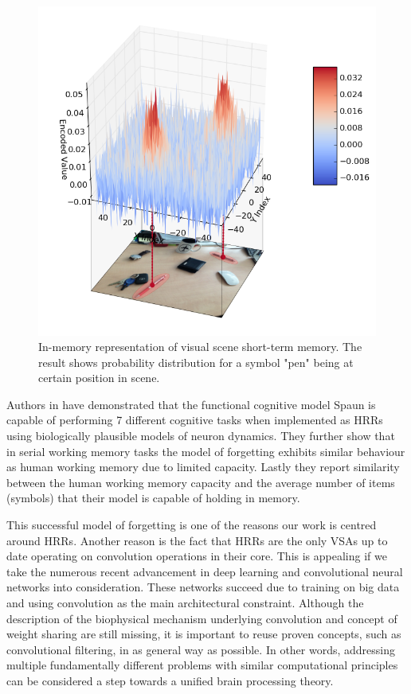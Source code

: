 \documentclass[conference]{IEEEtran}
\begin{document}
	
	\begin{figure}
		\center
		\includegraphics[width=0.9\columnwidth]{img/probe_for_pen_w_img.png}
		\caption{In-memory representation of visual scene short-term memory. The result shows probability distribution for a symbol "pen" being at certain position in scene.}
	\end{figure}
	
	
	Authors in \cite{Eliasmith:2012:LargeScaleModel} have demonstrated that the functional cognitive model Spaun is capable of performing 7 different cognitive tasks when implemented as HRRs using biologically plausible models of neuron dynamics.
They further show that in serial working memory tasks the model of forgetting exhibits similar behaviour as human working memory due to limited capacity.
Lastly they report similarity between the human working memory capacity and the average number of items (symbols) that their model is capable of holding in memory.

	This successful model of forgetting is one of the reasons our work is centred around HRRs. Another reason is the fact that HRRs are the only VSAs up to date operating on convolution operations in their core.
This is appealing if we take the numerous recent advancement in deep learning and convolutional neural networks into consideration.
These networks succeed due to training on big data and using convolution as the main architectural constraint.
Although the description of the biophysical mechanism underlying convolution and concept of weight sharing are still missing, it is important to reuse proven concepts, such as convolutional filtering, in as general way as possible.
In other words, addressing multiple fundamentally different problems with similar computational principles can be considered a step towards a unified brain processing theory.
	
\end{document}
